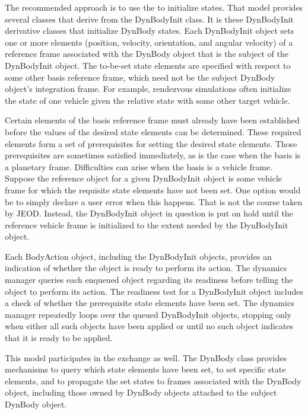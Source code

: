 The recommended approach is to use the \BODYACTION to initialize states.
That model provides several classes that derive from the DynBodyInit class.
It is these DynBodyInit derivative classes that initialize DynBody states.
Each DynBodyInit object sets one or more elements (position, velocity,
orientation, and angular velocity) of a reference frame associated with the
DynBody object that is the subject of the DynBodyInit object.
The to-be-set state elements are specified with respect to some other
basis reference frame, which need not be the subject DynBody object's
integration frame. For example, rendezvous simulations often initialize the
state of one vehicle given the relative state with some other target vehicle.

Certain elements of the basis reference frame must already have been
established before the values of the desired state elements can be determined.
These required elements form a set of prerequisites for setting the desired
state elements. Those prerequisites are sometimes satisfied immediately, as is
the case when the basis is a planetary frame. Difficulties can arise when the
basis is a vehicle frame. Suppose the reference object for a given
DynBodyInit object is some vehicle frame for which the requisite state elements
have not been set. One option would be to simply declare a user error when this
happens. That is not the course taken by JEOD.
Instead, the DynBodyInit object in question is put on hold until the reference
vehicle frame is initialized to the extent needed by the DynBodyInit object.

Each BodyAction object, including the DynBodyInit objects, provides an
indication of whether the object is ready to perform its action. The dynamics
manager queries each enqueued object regarding its readiness before telling
the object to perform its action. The readiness test for a DynBodyInit object
includes a check of whether the prerequisite state elements have been set.
The dynamics manager repeatedly loops over the queued DynBodyInit objects,
stopping only when either all such objects have been applied or until
no such object indicates that it is ready to be applied.

This model participates in the exchange as well. The DynBody class provides
mechanisms
to query which state elements have been set,
to set specific state elements, and
to propagate the set states to frames associated with the DynBody object,
including those owned by DynBody objects attached to the subject DynBody
object.


